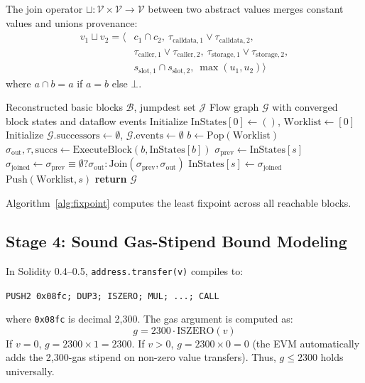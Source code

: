 \documentclass[conference]{IEEEtran}
\begin{document}
The join operator $\sqcup: \mathcal{V} \times \mathcal{V} \to \mathcal{V}$ between two abstract values merges constant values and unions provenance:
\begin{align}
v_1 \sqcup v_2 = \langle &c_1 \cap c_2, \ \tau_{\mathrm{calldata}, 1} \lor \tau_{\mathrm{calldata}, 2}, \nonumber \\
&\tau_{\mathrm{caller}, 1} \lor \tau_{\mathrm{caller}, 2}, \ \tau_{\mathrm{storage}, 1} \lor \tau_{\mathrm{storage}, 2}, \nonumber \\
&s_{\mathrm{slot}, 1} \cap s_{\mathrm{slot}, 2}, \ \max(u_1, u_2) \rangle
\end{align}
where $a \cap b = a$ if $a = b$ else $\bot$.

\begin{algorithm}[t]
\caption{Monotone Abstract Stack Dataflow Fixpoint}
\label{alg:fixpoint}
\begin{algorithmic}[1]
\REQUIRE Reconstructed basic blocks $\mathcal{B}$, jumpdest set $\mathcal{J}$
\ENSURE Flow graph $\mathcal{G}$ with converged block states and dataflow events
\STATE Initialize $\mathrm{InStates}[0] \leftarrow ()$, $\mathrm{Worklist} \leftarrow [0]$
\STATE Initialize $\mathcal{G}.\mathrm{successors} \leftarrow \emptyset$, $\mathcal{G}.\mathrm{events} \leftarrow \emptyset$
    \STATE $b \leftarrow \mathrm{Pop}(\mathrm{Worklist})$
    \STATE $\sigma_{\mathrm{out}}, \tau, \mathrm{succs} \leftarrow \mathrm{ExecuteBlock}(b, \mathrm{InStates}[b])$
        \STATE $\sigma_{\mathrm{prev}} \leftarrow \mathrm{InStates}[s]$
        \STATE $\sigma_{\mathrm{joined}} \leftarrow \sigma_{\mathrm{prev}} \equiv \emptyset ? \sigma_{\mathrm{out}} : \mathrm{Join}(\sigma_{\mathrm{prev}}, \sigma_{\mathrm{out}})$
            \STATE $\mathrm{InStates}[s] \leftarrow \sigma_{\mathrm{joined}}$
            \STATE $\mathrm{Push}(\mathrm{Worklist}, s)$
        \ENDIF
    \ENDFOR
\ENDWHILE
\STATE \textbf{return} $\mathcal{G}$
\end{algorithmic}
\end{algorithm}

Algorithm~\ref{alg:fixpoint} computes the least fixpoint across all reachable blocks. 

\subsection{Stage 4: Sound Gas-Stipend Bound Modeling}
In Solidity 0.4--0.5, \texttt{address.transfer(v)} compiles to:
\begin{center}
\small
\texttt{PUSH2 0x08fc; DUP3; ISZERO; MUL; ...; CALL}
\end{center}
where \texttt{0x08fc} is decimal 2,300. The gas argument is computed as:
\begin{equation}
g = 2300 \cdot \mathrm{ISZERO}(v)
\end{equation}
If $v = 0$, $g = 2300 \times 1 = 2300$. If $v > 0$, $g = 2300 \times 0 = 0$ (the EVM automatically adds the 2,300-gas stipend on non-zero value transfers). Thus, $g \le 2300$ holds universally.
\end{document}
